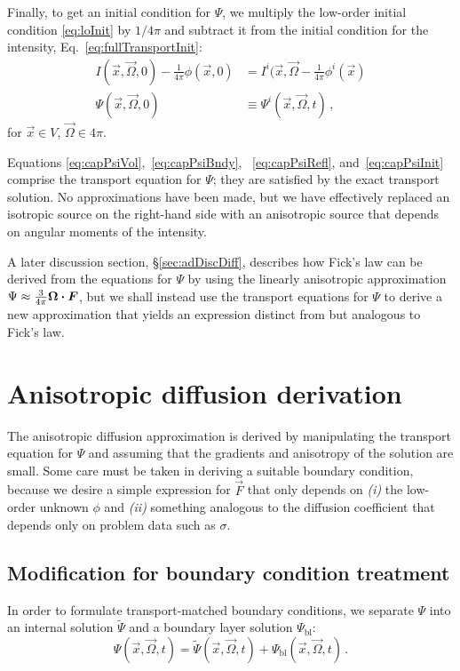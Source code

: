 Finally, to get an initial condition for $\Psi$, we
multiply the low-order initial condition \eqref{eq:loInit} by $1/4\pi$ and
subtract it from the initial condition for the intensity,
Eq.~\eqref{eq:fullTransportInit}:
\begin{align}\nonumber
  I(\vec{x}, \vec{\Omega}, 0) - \frac{1}{4\pi}\phi(\vec{x}, 0)
 &= I^i(\vec{x}, \vec{\Omega} - \frac1{4\pi} \phi^i(\vec{x})
 \\ \label{eq:capPsiInit}
 \Psi(\vec{x}, \vec{\Omega}, 0)
 &\equiv \Psi^i(\vec{x}, \vec{\Omega}, t)
 \,,
\end{align}
for $\vec{x} \in V$, $\vec{\Omega} \in 4\pi$.

Equations \eqref{eq:capPsiVol},~\eqref{eq:capPsiBndy},%
~\eqref{eq:capPsiRefl}, and~\eqref{eq:capPsiInit} comprise the transport
equation for $\Psi$; they are satisfied by the exact transport solution. No
approximations have been made, but we have effectively replaced an isotropic
source on the right-hand side with an anisotropic source that depends on
angular moments of the intensity.

A later discussion section, \S\ref{sec:adDiscDiff}, describes how Fick's law can
be derived from the equations for $\Psi$
by using the linearly anisotropic approximation \mbox{$\Psi\approx \frac{3}{4\pi}
\bm{\Omega}\bm{\cdot}\bm{F}$}, but we shall instead use the transport
equations for $\Psi$ to
derive a new approximation that yields an expression distinct from but 
analogous to Fick's law.

\section{Anisotropic diffusion derivation}
The anisotropic diffusion approximation is derived by manipulating the
transport equation for $\Psi$ and assuming that the gradients and anisotropy
of the solution are small. Some care must be taken in deriving
a suitable boundary condition, because we desire a simple expression for
$\vec{F}$ that only depends on \textsl{(i)} the low-order unknown $\phi$ and
\textsl{(ii)} something analogous to the diffusion coefficient that depends only
on problem data such as $\sigma$.

\subsection{Modification for boundary condition treatment}
In order to formulate transport-matched boundary conditions, we separate $\Psi$
into an internal solution $\tilde\Psi$ and a boundary layer solution
$\Psi_\mathrm{bl}$:
\begin{equation} \label{eq:boundaryLayerPsi}
  \Psi(\vec{x}, \vec{\Omega}, t)
  = \tilde\Psi(\vec{x}, \vec{\Omega}, t)
  + \Psi_\mathrm{bl}(\vec{x}, \vec{\Omega}, t)\,.
\end{equation}

